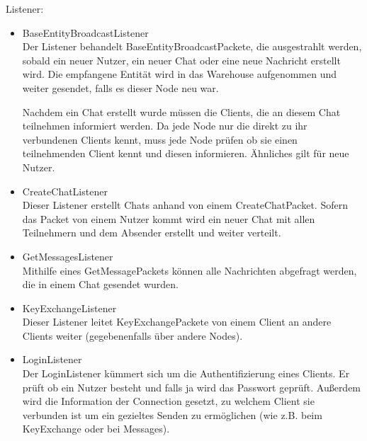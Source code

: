 Listener:
\begin{itemize}
    \item BaseEntityBroadcastListener\\
        Der Listener behandelt BaseEntityBroadcastPackete, die ausgestrahlt werden, sobald ein neuer Nutzer, ein neuer Chat oder eine neue Nachricht erstellt wird. Die empfangene Entität wird in das Warehouse aufgenommen und weiter gesendet, falls es dieser Node neu war.
        
        Nachdem ein Chat erstellt wurde müssen die Clients, die an diesem Chat teilnehmen informiert werden. Da jede Node nur die direkt zu ihr verbundenen Clients kennt, muss jede Node prüfen ob sie einen teilnehmenden Client kennt und diesen informieren. Ähnliches gilt für neue Nutzer.
        
    \item CreateChatListener\\
        Dieser Listener erstellt Chats anhand von einem CreateChatPacket. Sofern das Packet von einem Nutzer kommt wird ein neuer Chat mit allen Teilnehmern und dem Absender erstellt und weiter verteilt.
        
    \item GetMessagesListener\\
        Mithilfe eines GetMessagePackets können alle Nachrichten abgefragt werden, die in einem Chat gesendet wurden.
        
    \item KeyExchangeListener\\
        Dieser Listener leitet KeyExchangePackete von einem Client an andere Clients weiter (gegebenenfalls über andere Nodes).
        
    \item LoginListener\\
        Der LoginListener kümmert sich um die Authentifizierung eines Clients. Er prüft ob ein Nutzer besteht und falls ja wird das Passwort geprüft.
        Außerdem wird die Information der Connection gesetzt, zu welchem Client sie verbunden ist um ein gezieltes Senden zu ermöglichen (wie z.B. beim KeyExchange oder bei Messages).

\end{itemize}
